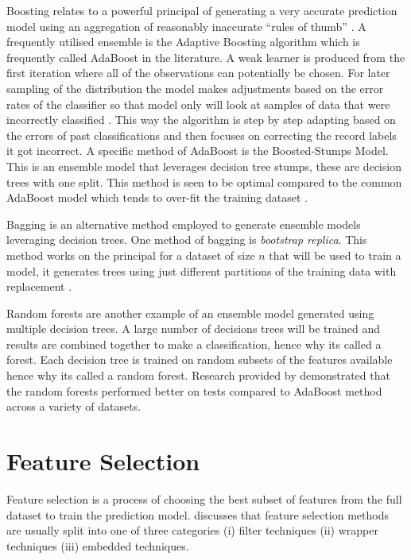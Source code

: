 Boosting relates to a powerful principal of generating a very accurate prediction model using an aggregation of reasonably inaccurate ``rules of thumb'' \citep{freund_short_1999}. A frequently utilised ensemble is the Adaptive Boosting algorithm which is frequently called AdaBoost in the literature. A weak learner is produced from the first iteration where all of the observations can potentially be chosen. For later sampling of the distribution the model makes adjustments based on the error rates of the classifier so that model only will look at samples of data that were incorrectly classified \citep{freund_short_1999}. This way the algorithm is step by step adapting based on the errors of past classifications and then focuses on correcting the record labels it got incorrect. A specific method of AdaBoost is the Boosted-Stumps Model. This is an ensemble model that leverages decision tree stumps, these are decision trees with one split. This method is seen to be optimal compared to the common AdaBoost model which tends to over-fit the training dataset \citep{caruana_empirical_2006}.

Bagging is an alternative method employed to generate ensemble models leveraging decision trees. One method of bagging is \textit{bootstrap replica}. This method works on the principal for a dataset of size $n$ that will be used to train a model, it generates trees using just different partitions of the training data with replacement \citep{dietterich_experimental_2000}. 

Random forests are another example of an ensemble model generated using multiple decision trees. A large number of decisions trees will be trained and results are combined together to make a classification, hence why its called a forest. Each decision tree is trained on random subsets of the features available hence why its called a random forest. Research provided by \cite{breiman_random_2001} demonstrated that the random forests performed better on tests compared to AdaBoost method across a variety of datasets.


\section{Feature Selection}\label{sec2:featureSection}
Feature selection is a process of choosing the best subset of features from the full dataset to train the prediction model. \cite{guyon_introduction_2003} discusses that feature selection methods are usually split into one of three categories (i) filter techniques (ii) wrapper techniques (iii) embedded techniques. 


